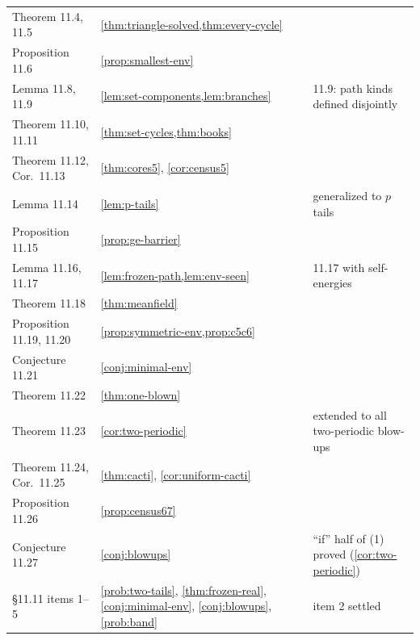\begin{center}
\begin{longtable}{@{}L{0.29}L{0.33}L{0.31}@{}}
Theorem 11.4, 11.5 & \cref{thm:triangle-solved,thm:every-cycle} & \\
Proposition 11.6 & \cref{prop:smallest-env} & \\
Lemma 11.8, 11.9 & \cref{lem:set-components,lem:branches} & 11.9: path kinds defined disjointly\\
Theorem 11.10, 11.11 & \cref{thm:set-cycles,thm:books} & \\
Theorem 11.12, Cor.\ 11.13 & \cref{thm:cores5}, \cref{cor:census5} & \\
Lemma 11.14 & \cref{lem:p-tails} & generalized to $p$ tails\\
Proposition 11.15 & \cref{prop:ge-barrier} & \\
Lemma 11.16, 11.17 & \cref{lem:frozen-path,lem:env-seen} & 11.17 with self-energies\\
Theorem 11.18 & \cref{thm:meanfield} & \\
Proposition 11.19, 11.20 & \cref{prop:symmetric-env,prop:c5c6} & \\
Conjecture 11.21 & \cref{conj:minimal-env} & \\
Theorem 11.22 & \cref{thm:one-blown} & \\
Theorem 11.23 & \cref{cor:two-periodic} & extended to all two-periodic blow-ups\\
Theorem 11.24, Cor.\ 11.25 & \cref{thm:cacti}, \cref{cor:uniform-cacti} & \\
Proposition 11.26 & \cref{prop:census67} & \\
Conjecture 11.27 & \cref{conj:blowups} & ``if'' half of (1) proved (\cref{cor:two-periodic})\\
\S11.11 items 1--5 & \cref{prob:two-tails}, \cref{thm:frozen-real}, \cref{conj:minimal-env}, \cref{conj:blowups}, \cref{prob:band} & item 2 settled\\
\bottomrule
\end{longtable}
\end{center}

